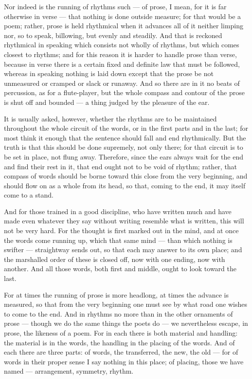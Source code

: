 Nor indeed is the running of rhythms such — of prose, I mean, for it is far otherwise in verse — that nothing is done outside measure; for that would be a poem; rather, prose is held rhythmical when it advances all of it neither limping nor, so to speak, billowing, but evenly and steadily. And that is reckoned rhythmical in speaking which consists not wholly of rhythms, but which comes closest to rhythms; and for this reason it is harder to handle prose than verse, because in verse there is a certain fixed and definite law that must be followed, whereas in speaking nothing is laid down except that the prose be not unmeasured or cramped or slack or runaway. And so there are in it no beats of percussion, as for a flute-player, but the whole compass and contour of the prose is shut off and bounded — a thing judged by the pleasure of the ear.

 It is usually asked, however, whether the rhythms are to be maintained throughout the whole circuit of the words, or in the first parts and in the last; for most think it enough that the sentence should fall and end rhythmically. But the truth is that this should be done supremely, not only there; for that circuit is to be set in place, not flung away. Therefore, since the ears always wait for the end and find their rest in it, that end ought not to be void of rhythm; rather, that compass of words should be borne toward this close from the very beginning, and should flow on as a whole from its head, so that, coming to the end, it may itself come to a stand.

 And for those trained in a good discipline, who have written much and have made even whatever they say without writing resemble what is written, this will not be very hard. For the thought is first marked out in the mind, and at once the words come running up, which that same mind — than which nothing is swifter — straightway sends out, so that each may answer to its own place; and the marshalled order of these is closed off, now with one ending, now with another. And all those words, both first and middle, ought to look toward the last.

 For at times the running of prose is more headlong, at times the advance is measured, so that from the very beginning one must see by what road one wishes to come to the end. And in rhythms no more than in the other ornaments of prose — though we do the same things the poets do — we nevertheless escape, in prose, the likeness of a poem. For in each there is both material and handling: the material is in the words, the handling in the placing of the words. And of each there are three parts: of words, the transferred, the new, the old — for of words in their proper sense I say nothing in this place; of placing, those we have named — arrangement, symmetry, rhythm.

